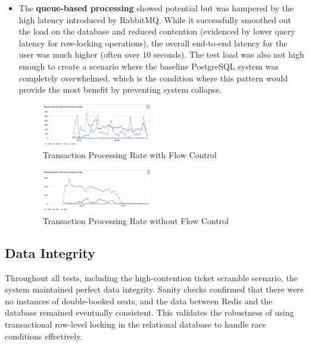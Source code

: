 \begin{itemize}
    \item The \textbf{queue-based processing} showed potential but was hampered by the high latency introduced by RabbitMQ. While it successfully smoothed out the load on the database and reduced contention (evidenced by lower query latency for row-locking operations), the overall end-to-end latency for the user was much higher (often over 10 seconds). The test load was also not high enough to create a scenario where the baseline PostgreSQL system was completely overwhelmed, which is the condition where this pattern would provide the most benefit by preventing system collapse.
          \begin{figure}[H]
              \centering
              \includegraphics[width=0.45\textwidth]{resources/chapter-4/rps-fc-pg-stress-0.png}
              \caption{Transaction Processing Rate with Flow Control}
              \label{fig:rps-fc-pg-stress-0}
          \end{figure}
          \begin{figure}[H]
              \centering
              \includegraphics[width=0.45\textwidth]{resources/chapter-4/rps-nofc-pg-stress-0.png}
              \caption{Transaction Processing Rate without Flow Control}
              \label{fig:rps-nofc-pg-stress-0}
          \end{figure}
\end{itemize}

\subsection{Data Integrity}
Throughout all tests, including the high-contention ticket scramble scenario, the system maintained perfect data integrity. Sanity checks confirmed that there were no instances of double-booked seats, and the data between Redis and the database remained eventually consistent. This validates the robustness of using transactional row-level locking in the relational database to handle race conditions effectively.

